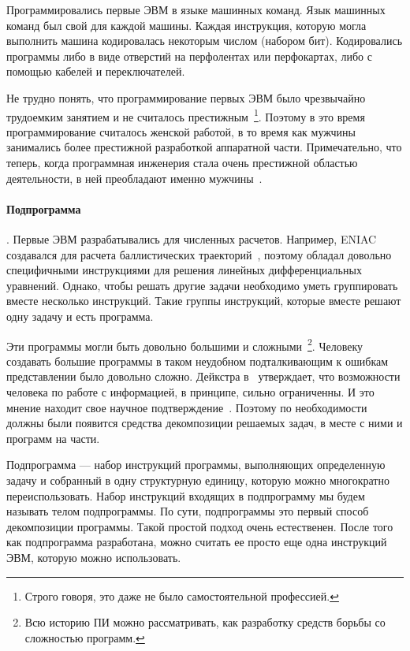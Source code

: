 Программировались первые ЭВМ в языке машинных команд. Язык машинных команд был свой для каждой машины. Каждая инструкция, которую могла выполнить машина кодировалась некоторым числом (набором бит). Кодировались программы либо в виде отверстий на перфолентах или перфокартах, либо с помощью кабелей и переключателей.

Не трудно понять, что программирование первых ЭВМ было чрезвычайно трудоемким занятием и не считалось престижным~\footnote{Строго говоря, это даже не было самостоятельной профессией.}. Поэтому в это время программирование считалось женской работой, в то время как мужчины занимались более престижной разработкой аппаратной части. Примечательно, что теперь, когда программная инженерия стала очень престижной областью деятельности, в ней преобладают именно мужчины~\cite{CSWOMEN}.

\paragraph{Подпрограмма}. Первые ЭВМ разрабатывались для численных расчетов. Например, ENIAC создавался для расчета баллистических траекторий~\cite{Randall:2006:ENIAC}, поэтому обладал довольно специфичными инструкциями для решения линейных дифференциальных уравнений. Однако, чтобы решать другие задачи необходимо уметь группировать вместе несколько инструкций. Такие группы инструкций, которые вместе решают одну задачу и есть программа.

Эти программы могли быть довольно большими и сложными~\footnote{Всю историю ПИ можно рассматривать, как разработку средств борьбы со сложностью программ.}. Человеку создавать большие программы в таком неудобном подталкивающим к ошибкам представлении было довольно сложно. Дейкстра в~\cite{Dijkstra:1972:CIN} утверждает, что возможности человека по работе с информацией, в принципе, сильно ограниченны. И это мнение находит свое научное подтверждение~\cite{Miller}. Поэтому по необходимости должны были появится средства декомпозиции решаемых задач, в месте с ними и программ на части.

Подпрограмма — набор инструкций программы, выполняющих определенную задачу и собранный в одну структурную единицу, которую можно многократно переиспользовать. Набор инструкций входящих в подпрограмму мы будем называть телом подпрограммы. По сути, подпрограммы это первый способ декомпозиции программы. Такой простой подход очень естественен. После того как подпрограмма разработана, можно считать ее просто еще одна инструкций ЭВМ, которую можно использовать.

